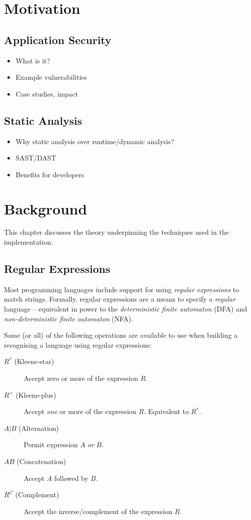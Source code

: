 \documentclass[a4paper,openany]{book}
\begin{document}
\tableofcontents


\chapter{Motivation}

\section{Application Security}

\begin{itemize}
	\item What is it?
	\item Example vulnerabilities
	\item Case studies, impact
\end{itemize}

\section{Static Analysis}

\begin{itemize}
	\item Why static analysis over runtime/dynamic analysis?
	\item SAST/DAST
	\item Benefits for developers
\end{itemize}


\chapter{Background}
This chapter discusses the theory underpinning the techniques used in the implementation.


\section{Regular Expressions}

Most programming languages include support for using \emph{regular expressions} to match strings. Formally, regular expressions are a means to specify a \emph{regular} language -- equivalent in power to the \emph{deterministic finite automaton} (DFA) and \emph{non-deterministic finite automaton} (NFA).



Some (or all) of the following operations are available to use when building a recognising a language using regular expressions:

\begin{description}
	\item[$R^*$ (Kleene-star)] Accept zero or more of the expression $R$.
	\item[$R^+$ (Kleene-plus)] Accept \emph{one} or more of the expression $R$. Equivalent to ${R^*}$.
	\item[$A \vert{} B$ (Alternation)] Permit expression $A$ \emph{or} $B$.
	\item[$AB$ (Concatenation)] Accept $A$ followed by $B$.
	\item[$R^C$ (Complement)] Accept the inverse/complement of the expression $R$.
\end{description}
\end{document}
